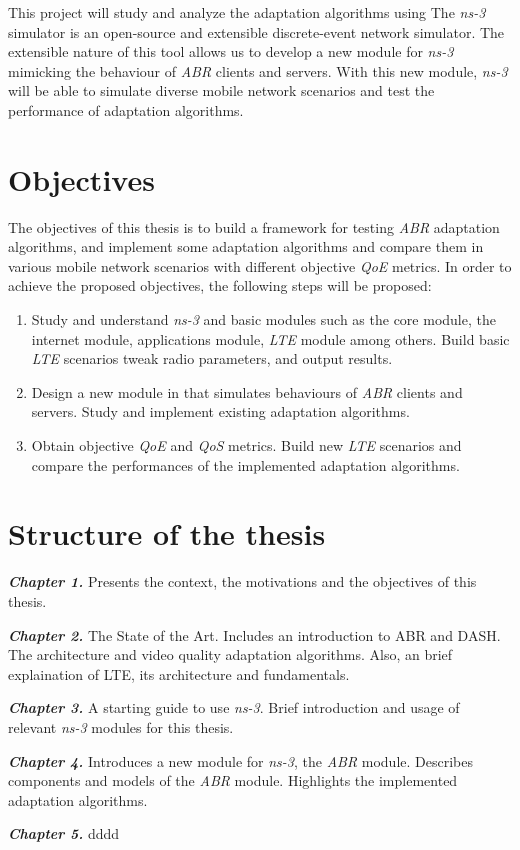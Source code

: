This project will study and analyze the adaptation algorithms using \textit{}
The \textit{ns-3} simulator is an open-source and extensible discrete-event network simulator. 
The extensible nature of this tool allows us to develop a new module for \textit{ns-3}
mimicking the behaviour of \textit{ABR} clients and servers. With this new module, \textit{ns-3} 
will be able to simulate diverse mobile network scenarios and test the performance of adaptation algorithms.



\section{Objectives}
\label{sec:objectives}
The objectives of this thesis is to build a framework for testing \textit{ABR} adaptation
algorithms, and implement some adaptation algorithms and compare them in 
various mobile network scenarios with different objective \textit{QoE} metrics. 
In order to achieve the proposed objectives, the following steps will be proposed:

\begin{enumerate}
  \item Study and understand \textit{ns-3} and basic modules such as the core module, the
  internet module, applications module, \textit{LTE} module among others. Build basic \textit{LTE} scenarios
  tweak radio parameters, and output results.
  \item Design a new module in  that simulates behaviours of \textit{ABR} clients
  and servers. Study and implement existing adaptation algorithms.
  \item Obtain objective \textit{QoE} and \textit{QoS} metrics.
  Build new \textit{LTE} scenarios and compare the performances of the implemented adaptation
  algorithms.
\end{enumerate}


\section{Structure of the thesis}
\label{sec:structure}


\textbf{\textit{Chapter 1.}} Presents the context, the motivations and the objectives of this thesis.

\textbf{\textit{Chapter 2.}} The State of the Art. Includes an introduction to ABR and DASH. The architecture
and video quality adaptation algorithms. Also, an brief explaination of LTE, its architecture and fundamentals.

\textbf{\textit{Chapter 3.}} A starting guide to use \textit{ns-3}. Brief introduction and usage of 
relevant \textit{ns-3} modules for this thesis.

\textbf{\textit{Chapter 4.}} Introduces a new module for \textit{ns-3}, the \textit{ABR} module. Describes components 
and models of the \textit{ABR} module. Highlights the implemented adaptation algorithms.

\textbf{\textit{Chapter 5.}} dddd
